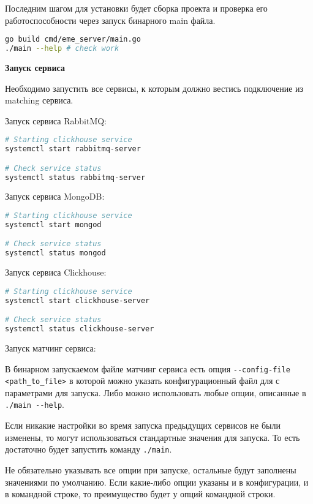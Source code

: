 Последним шагом для установки будет сборка проекта и проверка его работоспособности через запуск бинарного main файла.

\begin{lstlisting}[language=bash]
go build cmd/eme_server/main.go
./main --help # check work
\end{lstlisting}

\textbf{Запуск сервиса}

Необходимо запустить все сервисы, к которым должно вестись подключение из matching сервиса.

Запуск сервиса RabbitMQ:

\begin{lstlisting}[language=bash]
# Starting clickhouse service
systemctl start rabbitmq-server

# Check service status
systemctl status rabbitmq-server
\end{lstlisting}

Запуск сервиса MongoDB:

\begin{lstlisting}[language=bash]
# Starting clickhouse service
systemctl start mongod

# Check service status
systemctl status mongod
\end{lstlisting}

Запуск сервиса Clickhouse:

\begin{lstlisting}[language=bash]
# Starting clickhouse service
systemctl start clickhouse-server

# Check service status
systemctl status clickhouse-server
\end{lstlisting}

Запуск матчинг сервиса:

В бинарном запускаемом файле матчинг сервиса есть опция \lstinline{--config-file <path_to_file>} в которой можно указать конфигурационный файл для с параметрами для запуска. Либо можно использовать любые опции, описанные в \lstinline{./main --help}.

Если никакие настройки во время запуска предыдущих сервисов не были изменены, то могут использоваться стандартные значения для запуска. То есть достаточно будет запустить команду \lstinline{./main}.

Не обязательно указывать все опции при запуске, остальные будут заполнены значениями по умолчанию. Если какие-либо опции указаны и в конфигурации, и в командной строке, то преимущество будет у опций командной строки.

